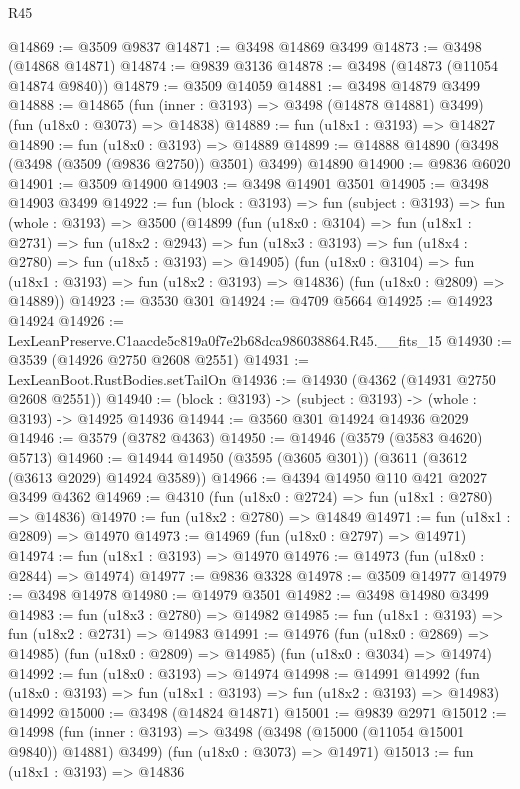 \begin{lexlean}{R45}
\begin{coremodule}
@14869 := @3509 @9837
@14871 := @3498 @14869 @3499
@14873 := @3498 (@14868 @14871)
@14874 := @9839 @3136
@14878 := @3498 (@14873 (@11054 @14874 @9840))
@14879 := @3509 @14059
@14881 := @3498 @14879 @3499
@14888 := @14865
    (fun (inner : @3193) => @3498 (@14878 @14881) @3499)
    (fun (u18x0 : @3073) => @14838)
@14889 := fun (u18x1 : @3193) => @14827
@14890 := fun (u18x0 : @3193) => @14889
@14899 := @14888 @14890 (@3498 (@3498 (@3509 (@9836 @2750)) @3501) @3499) @14890
@14900 := @9836 @6020
@14901 := @3509 @14900
@14903 := @3498 @14901 @3501
@14905 := @3498 @14903 @3499
@14922 := fun (block : @3193) =>
  fun (subject : @3193) =>
  fun (whole : @3193) =>
  @3500
    (@14899
      (fun (u18x0 : @3104) =>
      fun (u18x1 : @2731) =>
      fun (u18x2 : @2943) =>
      fun (u18x3 : @3193) => fun (u18x4 : @2780) => fun (u18x5 : @3193) => @14905)
      (fun (u18x0 : @3104) => fun (u18x1 : @3193) => fun (u18x2 : @3193) => @14836)
      (fun (u18x0 : @2809) => @14889))
@14923 := @3530 @301
@14924 := @4709 @5664
@14925 := @14923 @14924
@14926 := LexLeanPreserve.C1aacde5c819a0f7e2b68dca986038864.R45.__fits_15
@14930 := @3539 (@14926 @2750 @2608 @2551)
@14931 := LexLeanBoot.RustBodies.setTailOn
@14936 := @14930 (@4362 (@14931 @2750 @2608 @2551))
@14940 := (block : @3193) -> (subject : @3193) -> (whole : @3193) -> @14925 @14936
@14944 := @3560 @301 @14924 @14936 @2029
@14946 := @3579 (@3782 @4363)
@14950 := @14946 (@3579 (@3583 @4620) @5713)
@14960 := @14944 @14950 (@3595 (@3605 @301)) (@3611 (@3612 (@3613 @2029) @14924 @3589))
@14966 := @4394 @14950 @110 @421 @2027 @3499 @4362
@14969 := @4310 (fun (u18x0 : @2724) => fun (u18x1 : @2780) => @14836)
@14970 := fun (u18x2 : @2780) => @14849
@14971 := fun (u18x1 : @2809) => @14970
@14973 := @14969 (fun (u18x0 : @2797) => @14971)
@14974 := fun (u18x1 : @3193) => @14970
@14976 := @14973 (fun (u18x0 : @2844) => @14974)
@14977 := @9836 @3328
@14978 := @3509 @14977
@14979 := @3498 @14978
@14980 := @14979 @3501
@14982 := @3498 @14980 @3499
@14983 := fun (u18x3 : @2780) => @14982
@14985 := fun (u18x1 : @3193) => fun (u18x2 : @2731) => @14983
@14991 := @14976
    (fun (u18x0 : @2869) => @14985)
    (fun (u18x0 : @2809) => @14985)
    (fun (u18x0 : @3034) => @14974)
@14992 := fun (u18x0 : @3193) => @14974
@14998 := @14991
    @14992
    (fun (u18x0 : @3193) => fun (u18x1 : @3193) => fun (u18x2 : @3193) => @14983)
    @14992
@15000 := @3498 (@14824 @14871)
@15001 := @9839 @2971
@15012 := @14998
    (fun (inner : @3193) => @3498 (@3498 (@15000 (@11054 @15001 @9840)) @14881) @3499)
    (fun (u18x0 : @3073) => @14971)
@15013 := fun (u18x1 : @3193) => @14836

\end{coremodule}
\end{lexlean}
